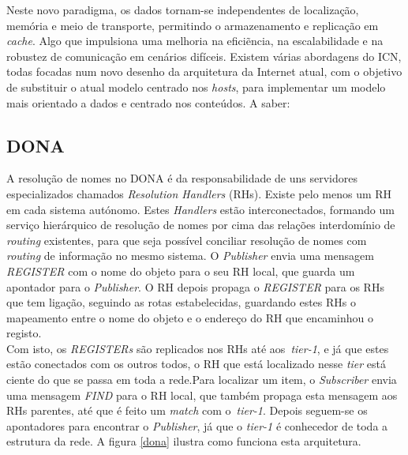 \documentclass[conference]{IEEEtran}
\begin{document}
Neste novo paradigma, os dados tornam-se independentes de localiza\c{c}\~{a}o, mem\'{o}ria e meio de transporte, permitindo o armazenamento e replica\c{c}\~{a}o em \textit{cache}. Algo que impulsiona uma melhoria na efici\~{e}ncia, na escalabilidade e na robustez de comunica\c{c}\~{a}o em cen\'{a}rios dif\'{i}ceis. Existem v\'{a}rias abordagens do ICN, todas focadas num novo desenho da arquitetura da Internet atual, com o objetivo de substituir o atual modelo centrado nos \textit{hosts}, para implementar um modelo mais orientado a dados e centrado nos conte\'{u}dos\cite{surveyICN}. A saber:\\



\subsection{DONA}

A resolu\c{c}\~{a}o de nomes no DONA\cite{dona} \'{e} da responsabilidade de uns servidores especializados chamados \textit{Resolution Handlers} (RHs). Existe pelo menos um RH em cada sistema aut\'{o}nomo. Estes \textit{Handlers} est\~{a}o interconectados, formando um servi\c{c}o hier\'{a}rquico de resolu\c{c}\~{a}o de nomes por cima das rela\c{c}\~{o}es interdom\'{i}nio de \textit{routing} existentes, para que seja poss\'{i}vel conciliar resolu\c{c}\~{a}o de nomes com \textit{routing} de informa\c{c}\~{a}o no mesmo sistema. O \textit{Publisher} envia uma mensagem \textit{REGISTER} com o nome do objeto para o seu RH local, que guarda um apontador para o \textit{Publisher}. O RH depois propaga o \textit{REGISTER} para os RHs que tem liga\c{c}\~{a}o, seguindo as rotas estabelecidas, guardando estes RHs o mapeamento entre o nome do objeto e o endere\c{c}o do RH que encaminhou o registo.\\

 Com isto, os \textit{REGISTERs} s\~{a}o replicados nos RHs at\'{e} aos~\textit{tier-1}, e j\'{a} que estes est\~{a}o conectados com os outros todos, o RH que est\'{a} localizado nesse \textit{tier} est\'{a} ciente do que se passa em toda a rede.Para localizar um item, o \textit{Subscriber} envia uma mensagem \textit{FIND} para o RH local, que tamb\'{e}m propaga esta mensagem aos RHs parentes, at\'{e} que \'{e} feito um \textit{match} com o~\textit{tier-1}. Depois seguem-se os apontadores para encontrar o \textit{Publisher}, j\'{a} que o \textit{tier-1} \'{e} conhecedor de toda a estrutura da rede. A figura \ref{dona} ilustra como funciona esta arquitetura.\\
\end{document}
